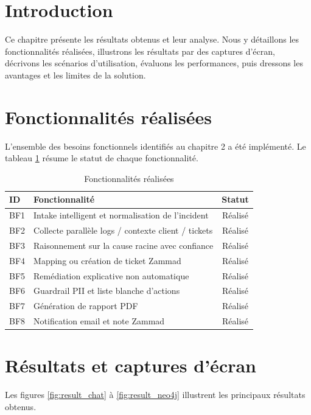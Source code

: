 \section*{Introduction}
Ce chapitre présente les résultats obtenus et leur analyse. Nous y détaillons les fonctionnalités réalisées, illustrons les résultats par des captures d'écran, décrivons les scénarios d'utilisation, évaluons les performances, puis dressons les avantages et les limites de la solution.

\section{Fonctionnalités réalisées}
L'ensemble des besoins fonctionnels identifiés au chapitre 2 a été implémenté. Le tableau \ref{tab:fonctionnalites} résume le statut de chaque fonctionnalité.

\begin{table}[H]
    \centering
    \renewcommand{\arraystretch}{1.2}
    \begin{tabular}{|l|p{8cm}|c|}
        \hline
        \rowcolor{iNavy} \textbf{\color{white}ID} & \textbf{\color{white}Fonctionnalité} & \textbf{\color{white}Statut} \\ \hline
        BF1 & Intake intelligent et normalisation de l'incident & Réalisé \\ \hline
        BF2 & Collecte parallèle logs / contexte client / tickets & Réalisé \\ \hline
        BF3 & Raisonnement sur la cause racine avec confiance & Réalisé \\ \hline
        BF4 & Mapping ou création de ticket Zammad & Réalisé \\ \hline
        BF5 & Remédiation explicative non automatique & Réalisé \\ \hline
        BF6 & Guardrail PII et liste blanche d'actions & Réalisé \\ \hline
        BF7 & Génération de rapport PDF & Réalisé \\ \hline
        BF8 & Notification email et note Zammad & Réalisé \\ \hline
    \end{tabular}
    \caption{Fonctionnalités réalisées}
    \label{tab:fonctionnalites}
\end{table}

\section{Résultats et captures d'écran}
Les figures \ref{fig:result_chat} à \ref{fig:result_neo4j} illustrent les principaux résultats obtenus.


